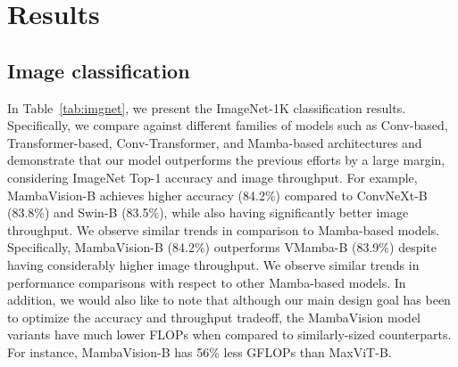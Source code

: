 \documentclass[10pt,twocolumn,letterpaper]{article}
\begin{document}
\section{Results}
\label{sec:results}
\subsection{Image classification}
In Table~\ref{tab:imgnet}, we present the ImageNet-1K classification results. Specifically, we compare against different families of models such as Conv-based, Transformer-based, Conv-Transformer, and Mamba-based architectures and demonstrate that our model outperforms the previous efforts by a large margin, considering ImageNet Top-1 accuracy and image throughput. For example, MambaVision-B achieves higher accuracy (84.2\%) compared to ConvNeXt-B (83.8\%) and Swin-B (83.5\%), while also having significantly better image throughput. We observe similar trends in comparison to Mamba-based models. Specifically, MambaVision-B (84.2\%) outperforms VMamba-B (83.9\%) despite having considerably higher image throughput. We observe similar trends in performance comparisons with respect to other Mamba-based models. In addition, we would also like to note that although our main design goal has been to optimize the accuracy and throughput tradeoff, the MambaVision model variants have much lower FLOPs when compared to similarly-sized counterparts. For instance, MambaVision-B has 56\% less GFLOPs than MaxViT-B.
\end{document}

